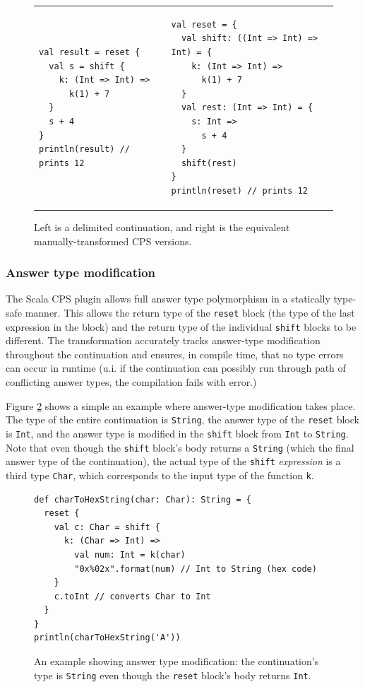 \begin{figure}[h!]
 
\begin{tabular}{ C{7cm}  C{8cm}}

\begin{lstlisting}
val result = reset {
  val s = shift {
    k: (Int => Int) =>
      k(1) + 7
  }
  s + 4
}
println(result) // prints 12
\end{lstlisting}
&
\begin{lstlisting}
val reset = {
  val shift: ((Int => Int) => Int) = {
    k: (Int => Int) =>
      k(1) + 7
  }
  val rest: (Int => Int) = {
    s: Int =>
      s + 4
  }
  shift(rest)
}
println(reset) // prints 12
\end{lstlisting}
\\
\end{tabular}
\caption{Left is a delimited continuation, and right is the equivalent manually-transformed CPS versions.}
\label{fig:example_cps_generic}
\end{figure}

\subsubsection{Answer type modification}

The Scala CPS plugin allows full answer type polymorphism in a statically type-safe manner. This allows the return type of the \texttt{reset} block (the type of the last expression in the block) and the return type of the individual \texttt{shift} blocks to be different. The transformation accurately tracks answer-type modification throughout the continuation and ensures, in compile time, that no type errors can occur in runtime (u.i. if the continuation can possibly run through path of conflicting answer types, the compilation fails with error.)

Figure \ref{fig:example_cps_answer_type_modification} shows a simple an example where answer-type modification takes place. The type of the entire continuation is \texttt{String}, the answer type of the \texttt{reset} block is \texttt{Int}, and the answer type is modified in the \texttt{shift} block from \texttt{Int} to \texttt{String}. Note that even though the \texttt{shift} block's body returns a \texttt{String} (which the final answer type of the continuation), the actual type of the \texttt{shift} \emph{expression} is a third type \texttt{Char}, which corresponds to the input type of the function \texttt{k}.

\begin{figure}[h!] 
\begin{lstlisting}
def charToHexString(char: Char): String = {
  reset {
    val c: Char = shift {
      k: (Char => Int) =>
        val num: Int = k(char)
        "0x%02x".format(num) // Int to String (hex code)
    }
    c.toInt // converts Char to Int
  }
}
println(charToHexString('A'))
\end{lstlisting}
\caption{An example showing answer type modification: the continuation's type is \texttt{String} even though the \texttt{reset} block's body returns \texttt{Int}.}
\label{fig:example_cps_answer_type_modification}
\end{figure}

